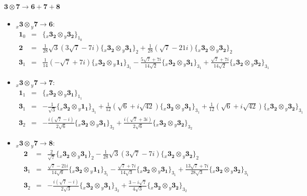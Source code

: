 \documentclass[english]{article}
\newcommand{\rep}[1]{\mathbf{#1}}
\newcommand{\repx}[2]{{}_{#2}\mathbf{#1}}
\newcommand{\subcg}[3]{\big\{ \repx{#1}{x}\otimes\repx{#2}{y}\big\}^{}_{#3}}
\begin{document}
\paragraph*{\Large $\rep{3}\otimes\rep{7}\to\rep{6}+\rep{7}+\rep{8}$}
\begin{itemize}
\item $\repx{3}{x}\otimes\repx{7}{y}\to\rep{6}$:
\begin{eqnarray*}
\rep{1}_{0} &=& \subcg{3_{2}}{3_{2}}{1_{0}}
\\
\rep{2} &=& \frac{1}{28} \sqrt{3} \left(3 \sqrt{7}-7 i\right)\subcg{3_{2}}{3_{1}}{2}+\frac{1}{28} \left(\sqrt{7}-21 i\right)\subcg{3_{2}}{3_{2}}{2}
\\
\rep{3}_{1} &=& \frac{1}{14} \left(-\sqrt{7}+7 i\right)\subcg{3_{2}}{1_{1}}{3_{1}}-\frac{5 \sqrt{7}+7 i}{14 \sqrt{2}}\subcg{3_{2}}{3_{1}}{3_{1}}+\frac{\sqrt{7}+7 i}{14 \sqrt{2}}\subcg{3_{2}}{3_{2}}{3_{1}}
\end{eqnarray*}
\item $\repx{3}{x}\otimes\repx{7}{y}\to\rep{7}$:
\begin{eqnarray*}
\rep{1}_{1} &=& \subcg{3_{2}}{3_{1}}{1_{1}}
\\
\rep{3}_{1} &=& -\frac{1}{\sqrt{3}}\subcg{3_{2}}{1_{1}}{3_{1}}+\frac{1}{12} \left(\sqrt{6}+i \sqrt{42}\right)\subcg{3_{2}}{3_{1}}{3_{1}}+\frac{1}{12} \left(\sqrt{6}+i \sqrt{42}\right)\subcg{3_{2}}{3_{2}}{3_{1}}
\\
\rep{3}_{2} &=& -\frac{i \left(\sqrt{7}-i\right)}{2 \sqrt{6}}\subcg{3_{2}}{3_{1}}{3_{2}}+\frac{i \left(\sqrt{7}+3 i\right)}{2 \sqrt{6}}\subcg{3_{2}}{3_{2}}{3_{2}}
\end{eqnarray*}
\item $\repx{3}{x}\otimes\repx{7}{y}\to\rep{8}$:
\begin{eqnarray*}
\rep{2} &=& \frac{2}{\sqrt{7}}\subcg{3_{2}}{3_{1}}{2}-\frac{1}{28} \sqrt{3} \left(3 \sqrt{7}-7 i\right)\subcg{3_{2}}{3_{2}}{2}
\\
\rep{3}_{1} &=& \frac{\sqrt{7}-21 i}{14 \sqrt{6}}\subcg{3_{2}}{1_{1}}{3_{1}}-\frac{\sqrt{7}+7 i}{14 \sqrt{3}}\subcg{3_{2}}{3_{1}}{3_{1}}+\frac{13 \sqrt{7}+7 i}{28 \sqrt{3}}\subcg{3_{2}}{3_{2}}{3_{1}}
\\
\rep{3}_{2} &=& -\frac{i \left(\sqrt{7}-i\right)}{2 \sqrt{3}}\subcg{3_{2}}{3_{1}}{3_{2}}+\frac{3-i \sqrt{7}}{4 \sqrt{3}}\subcg{3_{2}}{3_{2}}{3_{2}}
\end{eqnarray*}
\end{itemize}
\end{document}
